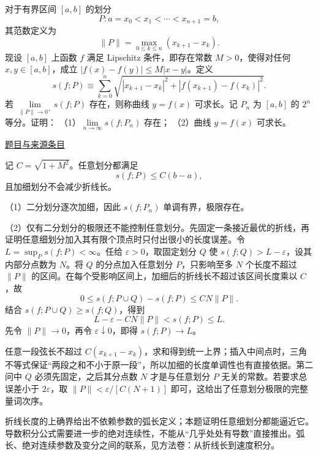 \documentclass[UTF8,12pt,a4paper,fontset=fandol]{ctexart}
\begin{document}
\begin{example}[来源序号6]\label{ex:ch09-12th-A:6}\label{pr:ch09-12th-A:6}

对于有界区间 $[a,b]$ 的划分
\[
P:a=x_{0}<x_{1}<\cdots<x_{n+1}=b,
\]
其范数定义为
\[
\|P\|=\max_{0\leq k\leq n}\left(x_{k+1}-x_{k}\right).
\]
现设 $[a,b]$ 上函数 $f$ 满足 Lipschitz 条件，即存在常数 $M>0$，使得对任何 $x,y\in[a,b]$，成立 $|f(x)-f(y)|\leq M|x-y|$。定义
\[
s(f;P)\equiv\sum_{k=0}^{n}\sqrt{\left|x_{k+1}-x_{k}\right|^{2}+\left|f\left(x_{k+1}\right)-f\left(x_{k}\right)\right|^{2}}.
\]
若 $\lim\limits_{\|P\|\to 0^{+}}s(f;P)$ 存在，则称曲线 $y=f(x)$ 可求长。记 $P_{n}$ 为 $[a,b]$ 的 $2^{n}$ 等分。证明：
（1）$\lim\limits_{n\to\infty}s\left(f;P_{n}\right)$ 存在；
（2）曲线 $y=f(x)$ 可求长。

\par\href{https://github.com/lzxcr/cmc-mathematics/blob/64916fa1fdbc3e444a652eca204d5669058ee321/src/problems/preliminary/12/06.md}{题目与来源条目}

\end{example}

\begin{solve}\label{ans:ch09-12th-A:6}

记 $C=\sqrt{1+M^2}$。任意划分都满足
\[
s(f;P)\leq C(b-a),
\]
且加细划分不会减少折线长。

（1）二分划分逐次加细，因此 $s(f;P_n)$ 单调有界，极限存在。

（2）仅有二分划分的极限还不能控制任意划分。先固定一条接近最优的折线，再证明任意细划分加入其有限个顶点时只付出很小的长度误差。令 $L=\sup_P s(f;P)<\infty$。任给 $\varepsilon>0$，取固定划分 $Q$ 使 $s(f;Q)>L-\varepsilon$，设其内部分点数为 $N$。将 $Q$ 的分点加入任意划分 $P$，只影响至多 $N$ 个长度不超过 $\|P\|$ 的区间。在每个受影响区间上，加细后的折线长不超过该区间长度乘以 $C$，故
\[
0\leq s(f;P\cup Q)-s(f;P)\leq CN\|P\|.
\]
结合 $s(f;P\cup Q)\geq s(f;Q)$，得到
\[
L-\varepsilon-CN\|P\|<s(f;P)\leq L.
\]
先令 $\|P\|\to0$，再令 $\varepsilon\downarrow0$，即得 $s(f;P)\to L$。

任意一段弦长不超过 $C(x_{k+1}-x_k)$，求和得到统一上界；插入中间点时，三角不等式保证“两段之和不小于原一段”，所以加细的长度单调性也有直接依据。第二问中 $Q$ 必须先固定，之后其分点数 $N$ 才是与任意划分 $P$ 无关的常数。若要求总误差小于 $2\varepsilon$，取 $\|P\|<\varepsilon/[C(N+1)]$ 即可，这给出了任意划分极限的完整量词次序。

\end{solve}

\begin{remark}[方法与条件]折线长度的上确界给出不依赖参数的弧长定义；本题证明任意细划分都能逼近它。导数积分公式需要进一步的绝对连续性，不能从“几乎处处有导数”直接推出。弧长、绝对连续参数及变分之间的联系，见方法卷：从折线长到速度积分。\end{remark}
\end{document}
